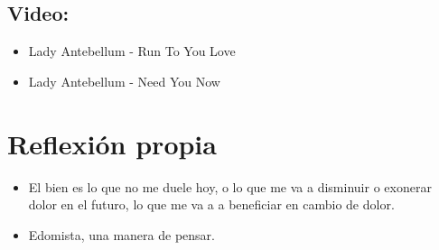 \subsection{Video:}
\begin{itemize}
    \item Lady Antebellum - Run To You Love 
    \item Lady Antebellum - Need You Now 
\end{itemize}



\section{Reflexión propia}
\begin{itemize}
    \item El bien es lo que no me duele hoy, o lo que me va a disminuir o exonerar dolor en el futuro, lo que me va a a beneficiar en cambio de dolor.
    \item Edomista, una manera de pensar.
\end{itemize}

